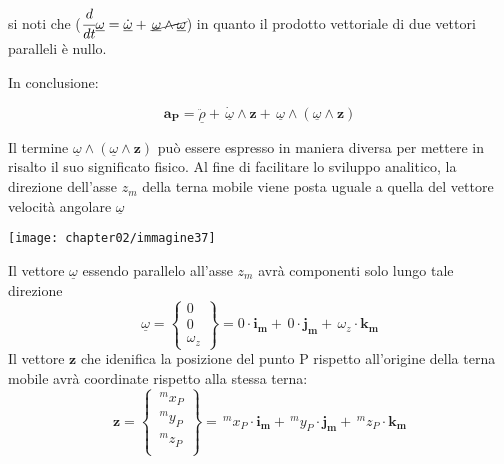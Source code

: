 			si noti che ($\cfrac{d}{dt} \underline{\omega} = \dot{\underline{\omega}} + \, \cancel{\underline{\omega} \wedge \underline{\omega}}$) in quanto il prodotto vettoriale di due vettori paralleli è nullo.
		
			In conclusione:

				\begin{equation*}
					\mathbf{a_P} = \ddot{\underline{\rho}} + \, \dot{\underline{\omega}} \wedge \mathbf{z} + \, \underline{\omega} \wedge (\underline{\omega}\wedge \mathbf{z})
				\end{equation*}
		
		Il termine $\underline{\omega} \wedge (\underline{\omega}\wedge \mathbf{z})$ può essere espresso in maniera diversa per mettere in risalto il suo significato fisico. Al fine di facilitare lo sviluppo analitico, la direzione dell'asse $z_m$ della terna mobile viene posta uguale a quella del vettore velocità angolare $\underline{\omega}$
		
		\begin{minipage}{.45\textwidth}
			\centering
			\texttt{[image: chapter02/immagine37]}
		\end{minipage}
		\hfill
		\begin{minipage}{.5\textwidth}
		Il vettore $\underline{\omega}$ essendo parallelo all'asse $z_m$ avrà componenti solo lungo tale direzione
		\begin{equation*}
		\underline{\omega} =
			\begin{Bmatrix}
			0\\
			0\\
			\omega_z
			\end{Bmatrix}
			= 0 \cdot \mathbf{i_m} + \, 0 \cdot \mathbf{j_m} + \, \omega_z \cdot \mathbf{k_m}
		\end{equation*}
		Il vettore $\mathbf{z}$ che idenifica la posizione del punto P rispetto all'origine della terna mobile avrà coordinate rispetto alla stessa terna:
		\begin{equation*}
			\mathbf{z} = 
			\begin{Bmatrix}
				\,^mx_P \\
				\,^my_P \\
				\,^mz_P \\ 
			\end{Bmatrix}
			= \,^mx_P \cdot \mathbf{i_m} + \,^my_P \cdot \mathbf{j_m} +\,^mz_P \cdot \mathbf{k_m} 
		\end{equation*}
		\end{minipage}
		\vspace{1mm}
		
